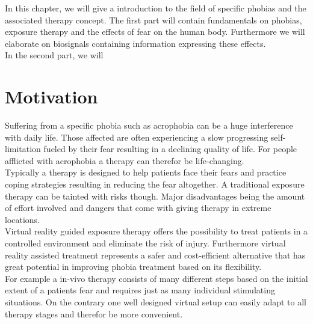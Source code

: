 
In this chapter, we will give a introduction to the field of specific phobias and the associated therapy concept. The first part will contain fundamentals on phobias, exposure therapy and the effects of fear on the human body. Furthermore we will elaborate on biosignals containing information expressing these effects.\\
In the second part, we will 
 
\section{Motivation}


Suffering from a specific phobia such as acrophobia can be a huge interference with daily life. Those affected are often experiencing a slow progressing self-limitation fueled by their fear resulting in a declining quality of life. For people afflicted with acrophobia a therapy can therefor be life-changing.\\
Typically a therapy is designed to help patients face their fears and practice coping strategies resulting in reducing the fear altogether. A traditional exposure therapy can  be tainted with risks though. Major disadvantages being the amount of effort involved and dangers that come with giving therapy in extreme locations.\\
Virtual reality guided exposure therapy offers the possibility to treat patients in a controlled environment and eliminate the risk of injury. Furthermore virtual reality assisted treatment represents a safer and cost-efficient alternative that has great potential in improving phobia treatment based on its flexibility.\\
For example a in-vivo therapy consists of many different steps based on the initial extent of a patients fear and requires just as many individual stimulating situations. On the contrary one well designed virtual setup can easily adapt to all therapy stages and therefor be more convenient.\\



